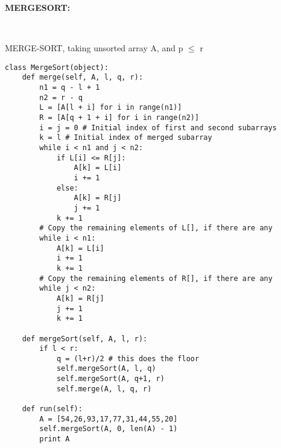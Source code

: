 \documentclass{article}
\begin{document}
\textbf{MERGESORT:} \\
    \begin{algorithm}
        \Indm{} \\
        \Indp
        \caption{MERGE-SORT, taking unsorted array A, and p $\leq$ r}
    \end{algorithm}
    \begin{verbatim}
class MergeSort(object):
    def merge(self, A, l, q, r):
        n1 = q - l + 1
        n2 = r - q
        L = [A[l + i] for i in range(n1)]
        R = [A[q + 1 + i] for i in range(n2)]
        i = j = 0 # Initial index of first and second subarrays
        k = l # Initial index of merged subarray
        while i < n1 and j < n2:
            if L[i] <= R[j]:
                A[k] = L[i]
                i += 1
            else:
                A[k] = R[j]
                j += 1
            k += 1
        # Copy the remaining elements of L[], if there are any
        while i < n1:
            A[k] = L[i]
            i += 1
            k += 1
        # Copy the remaining elements of R[], if there are any
        while j < n2:
            A[k] = R[j]
            j += 1
            k += 1

    def mergeSort(self, A, l, r):
        if l < r:
            q = (l+r)/2 # this does the floor
            self.mergeSort(A, l, q)
            self.mergeSort(A, q+1, r)
            self.merge(A, l, q, r)
            
    def run(self):
        A = [54,26,93,17,77,31,44,55,20]
        self.mergeSort(A, 0, len(A) - 1)
        print A
    \end{verbatim}
    
    
\end{document}
